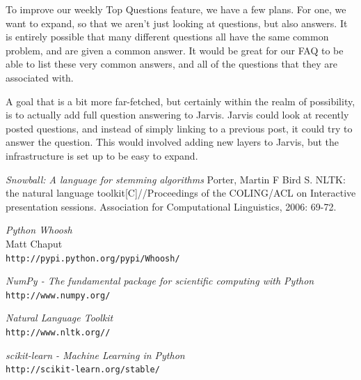 \documentclass[sigconf]{acmart}
\begin{document}
To improve our weekly Top Questions feature, we have a few plans. For one, we want to expand, so that we aren't just looking at questions, but also answers. It is entirely possible that many different questions all have the same common problem, and are given a common answer. It would be great for our FAQ to be able to list these very common answers, and all of the questions that they are associated with.

A goal that is a bit more far-fetched, but certainly within the realm of possibility, is to actually add full question answering to Jarvis. Jarvis could look at recently posted questions, and instead of simply linking to a previous post, it could try to answer the question. This would involved adding new layers to Jarvis, but the infrastructure is set up to be easy to expand.



 

\begin{thebibliography}{9}


\textit{Snowball: A language for stemming algorithms} 
Porter, Martin F
Bird S. NLTK: the natural language toolkit[C]//Proceedings of the COLING/ACL on Interactive presentation sessions. Association for Computational Linguistics, 2006: 69-72.

\textit{Python Whoosh} 
\\ Matt Chaput
\\\texttt{http://pypi.python.org/pypi/Whoosh/}
 
\textit{NumPy - The fundamental package for scientific computing with Python} 
\\\texttt{http://www.numpy.org/} 
 
\textit{Natural Language Toolkit} 
\\\texttt{http://www.nltk.org//}

\textit{scikit-learn - Machine Learning in Python} 
\\\texttt{http://scikit-learn.org/stable/}


\end{thebibliography}
\end{document}
